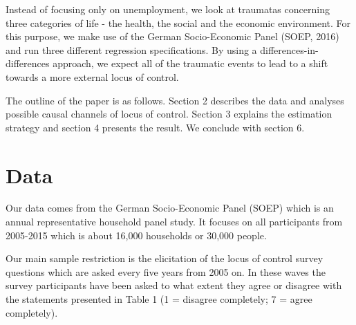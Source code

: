 \documentclass[12pt, a4paper, fleqn, parskip]{scrartcl}
\begin{document}
Instead of focusing only on unemployment, we look at traumatas concerning three
categories of life - the health, the social and the economic environment.  For
this purpose, we make use of the German Socio-Economic Panel (SOEP, 2016) and
run three different regression specifications. By using a differences-in-
differences approach, we expect all of the traumatic events to lead to a shift
towards a more external locus of control.

The outline of the paper is as follows. Section 2 describes the data and
analyses possible causal channels of locus of control. Section 3 explains the
estimation strategy and section 4 presents the result. We conclude with section
6.

\section{Data}

Our data comes from the German Socio-Economic Panel (SOEP) which is an annual
representative household panel study. It focuses on all participants from
2005-2015 which is about 16,000 households or 30,000 people.

Our main sample restriction is the elicitation of the locus of control survey
questions which are asked every five years from 2005 on. In these waves the
survey participants have been asked to what extent they agree or disagree with
the statements presented in Table 1 (1 = disagree completely; 7 = agree
completely).
\end{document}
